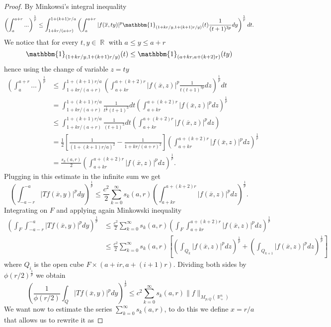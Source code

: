 \documentclass[12pt]{article}
\theoremstyle{definition}
\DeclareMathOperator\rr{\mathbb{R}}
\begin{document}
\begin{proof}
 By Minkowsi's integral inequality
 \[  \left( \int_{a}^{a+r} ...\right)^{\frac{1}{p}} \le \int_{1+kr/(a+r)}^{1+(k+1)r/a} \left ( \int_{a}^{a+r}|f(\overline x, ty)|^p\mathbbm{1}_{(1+kr/y,  1+(k+1)r/y ) }(t)\frac{1}{(t+1)^{3p}} dy \right) ^{\frac{1}{p}}dt.  \]
 We notice that for every $t,y \in \rr$ with $a \le y \le a+r$
 \[ \mathbbm{1}_{(1+kr/y,  1+(k+1)r/y ) }(t) \le \mathbbm{1}_{(a+kr, a+(k+2)r)}(ty)   \]
 hence using the change of variable $z=ty$
 \begin{align*}
\left( \int_{a}^{a+r} ...\right)^{\frac{1}{p}} &\le \int_{1+kr/(a+r)}^{1+(k+1)r/a} \left ( \int_{a+kr}^{a+(k+2)r}|f(\overline x, z)|^p \frac{1}{t(t+1)^{3p}} dz \right) ^{\frac{1}{p}}dt\\
&=\int_{1+kr/(a+r)}^{1+(k+1)r/a}\frac{1}{t^{\frac{1}{p}}(t+1)^{3}}dt \left ( \int_{a+kr}^{a+(k+2)r}|f(\overline x, z)|^p  dz \right) ^{\frac{1}{p}}\\
&\le \int_{1+kr/(a+r)}^{1+(k+1)r/a}\frac{1}{(t+1)^{3}}dt \left ( \int_{a+kr}^{a+(k+2)r}|f(\overline x, z)|^p  dz \right)\\
&= \frac{1}{2}\left[\frac{1}{(1+(k+1)r/a)^2}-\frac{1}{1+kr/(a+r)^2}\right] \left ( \int_{a+kr}^{a+(k+2)r}|f(\overline x, z)|^p  dz \right) ^{\frac{1}{p}}\\
&=\frac{s_k(a,r)}{2} \left ( \int_{a+kr}^{a+(k+2)r}|f(\overline x, z)|^p  dz \right) ^{\frac{1}{p}}.
\end{align*}
Plugging in this estimate in the infinite sum we get
\[ \left(\int_{-a-r}^{-a}|Tf(\overline x,y)|^p dy\right)^{\frac{1}{p}}\le \frac{c^2}{2} \sum_{k=0}^\infty s_k(a,r) \left ( \int_{a+kr}^{a+(k+2)r}|f(\overline x, z)|^p  dz \right) ^{\frac{1}{p}}.\]
Integrating on $F$ and applying again Minkowski inequality 
\begin{align*}
\left(\int_F\int_{-a-r}^{-a}|Tf(\overline x,y)|^p dy\right)^{\frac{1}{p}} &\le \frac{c^2}{2} \sum_{k=0}^\infty s_k(a,r) \left (\int_F \int_{a+kr}^{a+(k+2)r}|f(\overline x, z)|^p  dz \right) ^{\frac{1}{p}} \\
&\le \frac{c^2}{2} \sum_{k=0}^\infty s_k(a,r) \left[\left( \int_{Q_k}|f(\overline x, z)|^p  dz \right) ^{\frac{1}{p}} +\left (\int_{Q_{k+1}}|f(\overline x, z)|^p  dz \right) ^{\frac{1}{p}}\right] 
\end{align*}
where $Q_i$ is the open cube $F \times (a+ir,a+(i+1)r)$. Dividing both sides by $\phi(r/2)^{\frac{1}{p}}$ we obtain
\[\left(\frac{1}{\phi(r/2)}\int_Q|Tf(\overline x,y)|^p dy\right)^{\frac{1}{p}} \le c^2\sum_{k=0}^\infty s_k(a,r) \| f\|_{M_{p,Q}(\rr^n_+)} \]
We want now to estimate the series $\sum_{k=0}^\infty s_k(a,r)$, to do this we define $x=r/a$ that allows us to rewrite it as

\end{proof}
\end{document}
